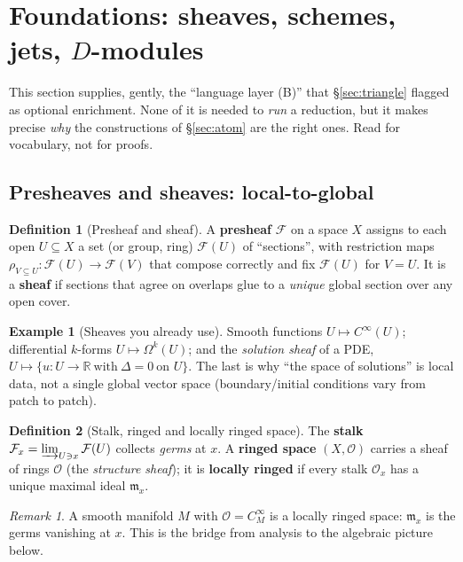 \documentclass[11pt]{article}
\theoremstyle{definition}
\newtheorem{definition}{Definition}[section]
\newtheorem{example}{Example}[section]
\theoremstyle{remark}
\newtheorem{remark}{Remark}[section]
\newcommand{\R}{\mathbb{R}}
\begin{document}
\section{Foundations: sheaves, schemes, jets, \texorpdfstring{$D$}{D}-modules}
\label{sec:foundations}

This section supplies, gently, the ``language layer (B)'' that \S\ref{sec:triangle} flagged as optional
enrichment. None of it is needed to \emph{run} a reduction, but it makes precise \emph{why} the
constructions of \S\ref{sec:atom} are the right ones. Read for vocabulary, not for proofs.

\subsection{Presheaves and sheaves: local-to-global}

\begin{definition}[Presheaf and sheaf]
A \textbf{presheaf} $\mathcal{F}$ on a space $X$ assigns to each open $U\subseteq X$ a set (or group,
ring) $\mathcal{F}(U)$ of ``sections'', with restriction maps
$\rho_{V\subseteq U}:\mathcal{F}(U)\to\mathcal{F}(V)$ that compose correctly and fix
$\mathcal{F}(U)$ for $V=U$. It is a \textbf{sheaf} if sections that agree on overlaps glue to a
\emph{unique} global section over any open cover.
\end{definition}

\begin{example}[Sheaves you already use]
Smooth functions $U\mapsto C^\infty(U)$; differential $k$-forms $U\mapsto\Omega^k(U)$; and the
\emph{solution sheaf} of a PDE, $U\mapsto\{u:U\to\R\ \text{with}\ \Delta=0\ \text{on }U\}$. The last
is why ``the space of solutions'' is local data, not a single global vector space (boundary/initial
conditions vary from patch to patch).
\end{example}

\begin{definition}[Stalk, ringed and locally ringed space]
The \textbf{stalk} $\mathcal{F}_x=\varinjlim_{U\ni x}\mathcal{F}(U)$ collects \emph{germs} at $x$. A
\textbf{ringed space} $(X,\mathcal{O})$ carries a sheaf of rings $\mathcal{O}$ (the \emph{structure
sheaf}); it is \textbf{locally ringed} if every stalk $\mathcal{O}_x$ has a unique maximal ideal
$\mathfrak{m}_x$.
\end{definition}

\begin{remark}
A smooth manifold $M$ with $\mathcal{O}=C^\infty_M$ is a locally ringed space: $\mathfrak{m}_x$ is the
germs vanishing at $x$. This is the bridge from analysis to the algebraic picture below.
\end{remark}
\end{document}
